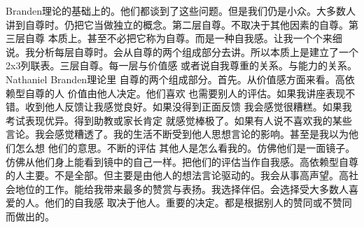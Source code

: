 Branden理论的基础上的。他们都谈到了这些问题。但是我们仍是小众。大多数人讲到自尊时。仍把它当做独立的概念。第二层自尊。不取决于其他因素的自尊。第三层自尊 本质上。甚至不必把它称为自尊。而是一种自我感。让我一个个来细说。我分析每层自尊时。会从自尊的两个组成部分去讲。所以本质上是建立了一个2x3列联表。三层自尊。每一层与价值感 或者说自我尊重的关系。与能力的关系。Nathaniel Branden理论里 自尊的两个组成部分。首先。从价值感方面来看。高依赖型自尊的人 价值由他人决定。他们喜欢 也需要别人的评估。如果我讲座表现不错。收到他人反馈让我感觉良好。如果没得到正面反馈 我会感觉很糟糕。如果我考试表现优异。得到助教或家长肯定 就感觉棒极了。如果有人说不喜欢我的某些言论。我会感觉糟透了。我的生活不断受到他人思想言论的影响。甚至是我以为他们怎么想 他们的意思。不断的评估 其他人是怎么看我的。仿佛他们是一面镜子。仿佛从他们身上能看到镜中的自己一样。把他们的评估当作自我感。高依赖型自尊的人主要。不是全部。但主要是由他人的想法言论驱动的。我会从事高声望。高社会地位的工作。能给我带来最多的赞赏与表扬。我选择伴侣。会选择受大多数人喜爱的人。他们的自我感 取决于他人。重要的决定。都是根据别人的赞同或不赞同而做出的。 

